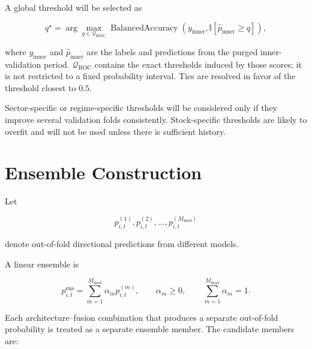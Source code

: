 \documentclass[11pt]{article}
\newcommand{\ind}{\mathbb{I}}
\begin{document}
A global threshold will be selected as

\begin{equation}
q^\star
=
\arg\max_{q\in\mathcal Q_{\mathrm{ROC}}}
\operatorname{BalancedAccuracy}
\left(
y_{\mathrm{inner}},
\ind[\widehat p_{\mathrm{inner}}\geq q]
\right),
\end{equation}

where $y_{\mathrm{inner}}$ and $\widehat p_{\mathrm{inner}}$ are the labels and
predictions from the purged inner-validation period.
$\mathcal Q_{\mathrm{ROC}}$ contains the exact thresholds induced by those
scores; it is not restricted to a fixed probability interval. Ties are
resolved in favor of the threshold closest to $0.5$.

Sector-specific or regime-specific thresholds will be considered only if they
improve several validation folds consistently. Stock-specific thresholds are
likely to overfit and will not be used unless there is sufficient history.

\section{Ensemble Construction}

Let

\begin{equation}
p^{(1)}_{i,t},
p^{(2)}_{i,t},
\ldots,
p^{(M_{\mathrm{mod}})}_{i,t}
\end{equation}

denote out-of-fold directional predictions from different models.

A linear ensemble is

\begin{equation}
p^{\mathrm{ens}}_{i,t}
 =
\sum_{m=1}^{M_{\mathrm{mod}}}
\alpha_m p^{(m)}_{i,t},
\qquad
\alpha_m\geq 0,
\qquad
\sum_{m=1}^{M_{\mathrm{mod}}}\alpha_m=1.
\end{equation}

Each architecture--fusion combination that produces a separate out-of-fold
probability is treated as a separate ensemble member.  The candidate members
are:
\end{document}
